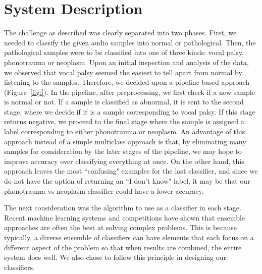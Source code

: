 \section{System Description}
The challenge as described was clearly separated into two phases. First, we needed to classify the given audio samples into normal or pathological. Then, the pathological samples were to be classified into one of three kinds: vocal palsy, phonotrauma or neoplasm. Upon an initial inspection and analysis of the data, we observed that vocal palsy seemed the easiest to tell apart from normal by listening to the samples. Therefore, we decided upon a pipeline based approach (Figure~\ref{fig:}). In the pipeline, after preprocessing, we first check if a new sample is normal or not. If a sample is classified as abnormal, it is sent to the second stage, where we decide if it is a sample corresponding to vocal palsy. If this stage returns negative, we proceed to the final stage where the sample is assigned a label corresponding to either phonotrauma or neoplasm. An advantage of this approach instead of a simple multiclass approach is that, by eliminating many samples for consideration by the later stages of the pipeline, we may hope to improve accuracy over classifying everything at once. On the other hand, this approach leaves the most ``confusing" examples for the last classifier, and since we do not have the option of returning an ``I don't know" label, it may be that our phonotrauma vs neoplasm classifier could have a lower accuracy.

The next consideration was the algorithm to use as a classifier in each stage. Recent machine learning systems and competitions have shown that ensemble approaches are often the best at solving complex problems. This is because typically, a diverse ensemble of classifiers can have elements that each focus on a different aspect of the problem so that when results are combined, the entire system does well. We also chose to follow this principle in designing our classifiers. 

